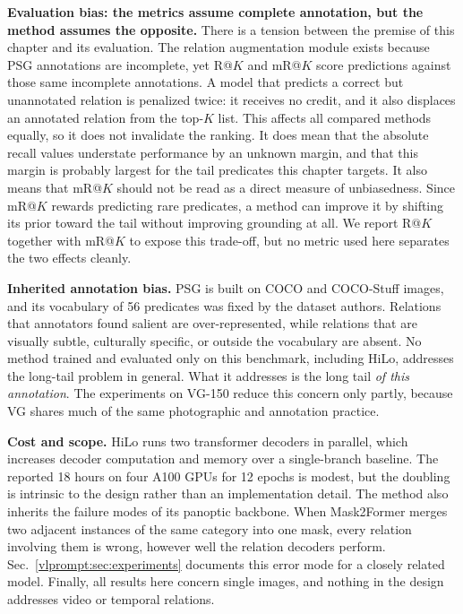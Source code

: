 \noindent \textbf{Evaluation bias: the metrics assume complete annotation, but the method assumes the opposite.}
There is a tension between the premise of this chapter and its evaluation. The relation augmentation module exists because PSG annotations are incomplete, yet R@$K$ and mR@$K$ score predictions against those same incomplete annotations. A model that predicts a correct but unannotated relation is penalized twice: it receives no credit, and it also displaces an annotated relation from the top-$K$ list. This affects all compared methods equally, so it does not invalidate the ranking. It does mean that the absolute recall values understate performance by an unknown margin, and that this margin is probably largest for the tail predicates this chapter targets. It also means that mR@$K$ should not be read as a direct measure of unbiasedness. Since mR@$K$ rewards predicting rare predicates, a method can improve it by shifting its prior toward the tail without improving grounding at all. We report R@$K$ together with mR@$K$ to expose this trade-off, but no metric used here separates the two effects cleanly.

\noindent \textbf{Inherited annotation bias.}
PSG is built on COCO and COCO-Stuff images, and its vocabulary of 56 predicates was fixed by the dataset authors. Relations that annotators found salient are over-represented, while relations that are visually subtle, culturally specific, or outside the vocabulary are absent. No method trained and evaluated only on this benchmark, including HiLo, addresses the long-tail problem in general. What it addresses is the long tail \emph{of this annotation}. The experiments on VG-150 reduce this concern only partly, because VG shares much of the same photographic and annotation practice.

\noindent \textbf{Cost and scope.}
HiLo runs two transformer decoders in parallel, which increases decoder computation and memory over a single-branch baseline. The reported 18 hours on four A100 GPUs for 12 epochs is modest, but the doubling is intrinsic to the design rather than an implementation detail. The method also inherits the failure modes of its panoptic backbone. When Mask2Former merges two adjacent instances of the same category into one mask, every relation involving them is wrong, however well the relation decoders perform. Sec.~\ref{vlprompt:sec:experiments} documents this error mode for a closely related model. Finally, all results here concern single images, and nothing in the design addresses video or temporal relations.


